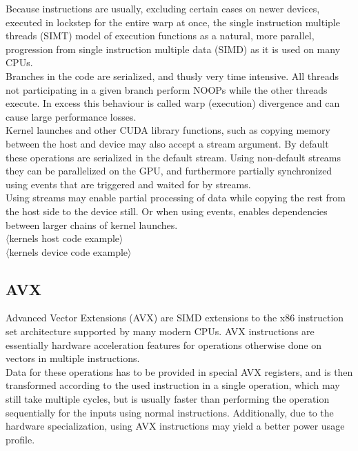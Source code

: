 \documentclass{tudscrreprt}
\newcommand{\markr}[1]{\textcolor{review}{$\langle$#1$\rangle$}}
\begin{document}
				Because instructions are usually, excluding certain cases on newer devices, executed in lockstep for the entire warp at once, the single instruction multiple threads (SIMT) model of execution functions as a natural, more parallel, progression from single instruction multiple data (SIMD) as it is used on many CPUs. \\
				Branches in the code are serialized, and thusly very time intensive. All threads not participating in a given branch perform NOOPs while the other threads execute. In excess this behaviour is called warp (execution) divergence and can cause large performance losses. \\
				
				Kernel launches and other CUDA library functions, such as copying memory between the host and device may also accept a stream argument. By default these operations are serialized in the default stream. Using non-default streams they can be parallelized on the GPU, and furthermore partially synchronized using events that are triggered and waited for by streams. \\
				Using streams may enable partial processing of data while copying the rest from the host side to the device still. Or when using events, enables dependencies between larger chains of kernel launches. \\
				
				\markr{kernels host code example}\\
				
				\markr{kernels device code example}\\
			
		\subsection{AVX}
			Advanced Vector Extensions (AVX) are SIMD extensions to the x86 instruction set architecture supported by many modern CPUs. AVX instructions are essentially hardware acceleration features for operations otherwise done on vectors in multiple instructions. \\
			Data for these operations has to be provided in special AVX registers, and is then transformed according to the used instruction in a single operation, which may still take multiple cycles, but is usually faster than performing the operation sequentially for the inputs using normal instructions. Additionally, due to the hardware specialization, using AVX instructions may yield a better power usage profile. \\
			
\end{document}
